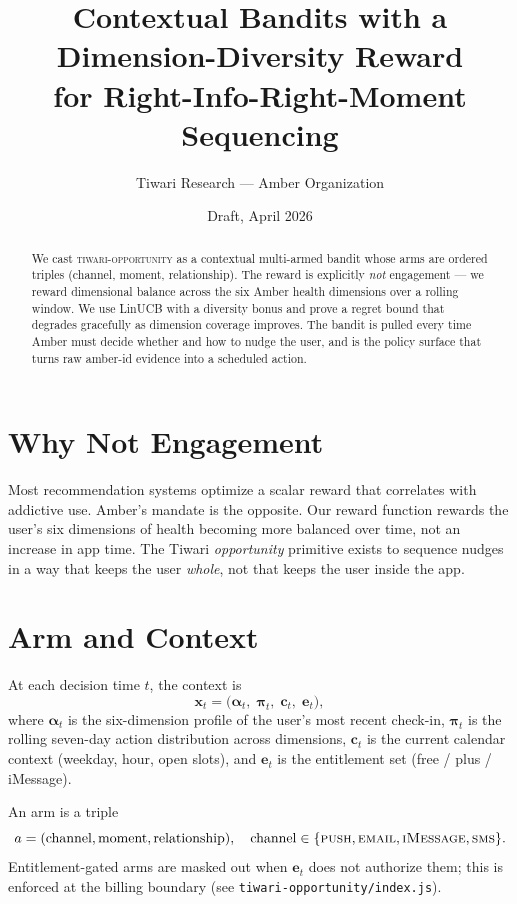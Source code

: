 \documentclass[11pt]{article}
\title{\textbf{Contextual Bandits with a Dimension-Diversity Reward \\ for Right-Info-Right-Moment Sequencing}}
\author{Tiwari Research --- Amber Organization}
\date{Draft, April 2026}
\begin{document}
\maketitle

\begin{abstract}
We cast \textsc{tiwari-opportunity} as a contextual multi-armed
bandit whose arms are ordered triples (channel, moment, relationship).
The reward is explicitly \emph{not} engagement --- we reward
dimensional balance across the six Amber health dimensions over a
rolling window. We use LinUCB with a diversity bonus and prove a
regret bound that degrades gracefully as dimension coverage improves.
The bandit is pulled every time Amber must decide whether and how to
nudge the user, and is the policy surface that turns raw amber-id
evidence into a scheduled action.
\end{abstract}

\section{Why Not Engagement}

Most recommendation systems optimize a scalar reward that correlates
with addictive use. Amber's mandate is the opposite. Our reward
function rewards the user's six dimensions of health becoming more
balanced over time, not an increase in app time. The Tiwari
\emph{opportunity} primitive exists to sequence nudges in a way that
keeps the user \emph{whole}, not that keeps the user inside the app.

\section{Arm and Context}

At each decision time $t$, the context is
\[
\bm{x}_t =
\bigl(\bm{\alpha}_t,\; \bm{\pi}_t,\; \bm{c}_t,\; \bm{e}_t\bigr),
\]
where $\bm{\alpha}_t$ is the six-dimension profile of the user's most
recent check-in, $\bm{\pi}_t$ is the rolling seven-day action
distribution across dimensions, $\bm{c}_t$ is the current calendar
context (weekday, hour, open slots), and $\bm{e}_t$ is the
entitlement set (free / plus / iMessage).

An arm is a triple
\[
a = (\text{channel}, \text{moment}, \text{relationship}),
\quad \text{channel} \in \{\textsc{push}, \textsc{email}, \textsc{iMessage}, \textsc{sms}\}.
\]
Entitlement-gated arms are masked out when
$\bm{e}_t$ does not authorize them; this is enforced at the billing
boundary (see \texttt{tiwari-opportunity/index.js}).
\end{document}
